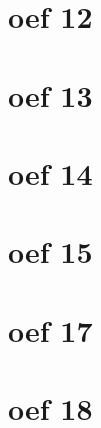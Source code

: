 \documentclass[lineaire_algebra_oplossingen.tex]{subfiles}
\begin{document}
\section{oef 12}
\section{oef 13}
\section{oef 14}
\section{oef 15}
\section{oef 17}
\section{oef 18}
\end{document}

